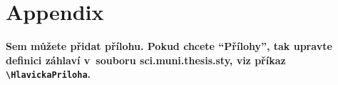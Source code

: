 \chapter*{Appendix}


{\bf Sem můžete přidat přílohu. Pokud chcete ``Přílohy'', tak upravte definici záhlaví v~souboru sci.muni.thesis.sty, viz příkaz
\verb+\HlavickaPriloha+.}
\medskip


\lipsum[50-51]

